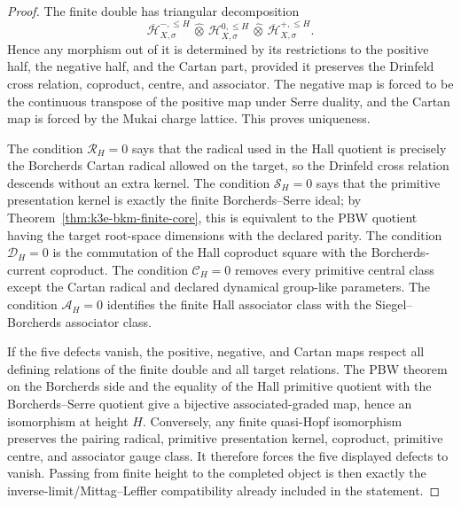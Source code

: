 \begin{proof}
The finite double has triangular decomposition
\[
 \overline{\mathcal H}^{-,\leq H}_{X,\sigma}\,
 \widehat\otimes\,
 \mathcal H^{0,\leq H}_{X,\sigma}\,
 \widehat\otimes\,
 \overline{\mathcal H}^{+,\leq H}_{X,\sigma}.
\]
Hence any morphism out of it is determined by its restrictions to the
positive half, the negative half, and the Cartan part, provided it
preserves the Drinfeld cross relation, coproduct, centre, and
associator. The negative map is forced to be the continuous transpose
of the positive map under Serre duality, and the Cartan map is forced
by the Mukai charge lattice. This proves uniqueness.

The condition \(\mathcal R_H=0\) says that the radical used in the Hall
quotient is precisely the Borcherds Cartan radical allowed on the
target, so the Drinfeld cross relation descends without an extra
kernel. The condition \(\mathcal S_H=0\) says that the primitive
presentation kernel is exactly the finite Borcherds--Serre ideal; by
Theorem~\ref{thm:k3e-bkm-finite-core}, this is equivalent to the PBW
quotient having the target root-space dimensions with the declared
parity. The condition \(\mathcal D_H=0\) is the commutation of the Hall
coproduct square with the Borcherds-current coproduct. The condition
\(\mathcal C_H=0\) removes every primitive central class except the
Cartan radical and declared dynamical group-like parameters. The
condition \(\mathcal A_H=0\) identifies the finite Hall associator
class with the Siegel--Borcherds associator class.

If the five defects vanish, the positive, negative, and Cartan maps
respect all defining relations of the finite double and all target
relations. The PBW theorem on the Borcherds side and the equality of
the Hall primitive quotient with the Borcherds--Serre quotient give a
bijective associated-graded map, hence an isomorphism at height \(H\).
Conversely, any finite quasi-Hopf isomorphism preserves the pairing
radical, primitive presentation kernel, coproduct, primitive centre,
and associator gauge class. It therefore forces the five displayed
defects to vanish. Passing from finite height to the completed object
is then exactly the inverse-limit/Mittag--Leffler compatibility already
included in the statement.
\end{proof}

